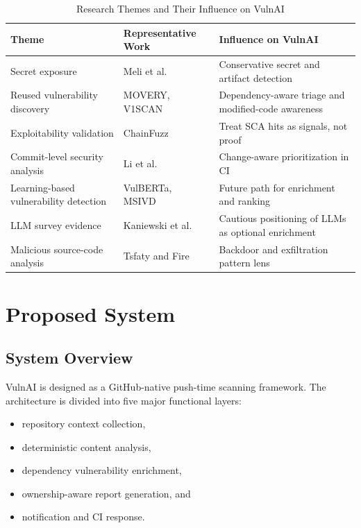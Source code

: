 \documentclass[conference]{IEEEtran}
\begin{document}
\begin{table}[htbp]
\caption{Research Themes and Their Influence on VulnAI}
\label{tab:litmap}
\centering
\renewcommand{\arraystretch}{1.2}
\begin{tabular}{p{2.0cm}p{2.15cm}p{2.8cm}}
\toprule
\textbf{Theme} & \textbf{Representative Work} & \textbf{Influence on VulnAI} \\
\midrule
Secret exposure & Meli et al.~\cite{meli2019how} & Conservative secret and artifact detection \\
Reused vulnerability discovery & MOVERY, V1SCAN~\cite{woo2022movery,woo2023v1scan} & Dependency-aware triage and modified-code awareness \\
Exploitability validation & ChainFuzz~\cite{deng2025chainfuzz} & Treat SCA hits as signals, not proof \\
Commit-level security analysis & Li et al.~\cite{li2023commit} & Change-aware prioritization in CI \\
Learning-based vulnerability detection & VulBERTa, MSIVD~\cite{hanif2022vulberta,yang2024msivd} & Future path for enrichment and ranking \\
LLM survey evidence & Kaniewski et al.~\cite{kaniewski2025slr} & Cautious positioning of LLMs as optional enrichment \\
Malicious source-code analysis & Tsfaty and Fire~\cite{tsfaty2023malicious} & Backdoor and exfiltration pattern lens \\
\bottomrule
\end{tabular}
\end{table}

\section{Proposed System}
\subsection{System Overview}
VulnAI is designed as a GitHub-native push-time scanning framework. The architecture is divided into five major functional layers:
\begin{itemize}
\item repository context collection,
\item deterministic content analysis,
\item dependency vulnerability enrichment,
\item ownership-aware report generation, and
\item notification and CI response.
\end{itemize}
\end{document}

